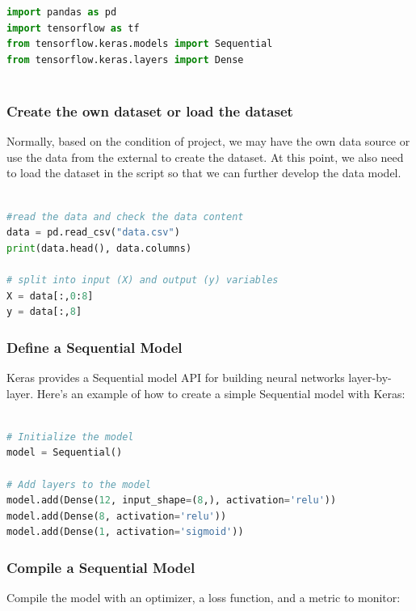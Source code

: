 	\begin{lstlisting}[language=python]
import pandas as pd
import tensorflow as tf
from tensorflow.keras.models import Sequential
from tensorflow.keras.layers import Dense
	
	\end{lstlisting}

	\subsubsection{Create the own dataset or load the dataset}
Normally, based on the condition of project, we may have the own data source or use the data from the external to create the dataset. At this point, we also need to load the dataset in the script so that we can further develop the data model. \cite{brownlee:2022}

\begin{lstlisting}[language=python]
	
#read the data and check the data content 
data = pd.read_csv("data.csv")
print(data.head(), data.columns)

# split into input (X) and output (y) variables
X = data[:,0:8]
y = data[:,8]

\end{lstlisting}

\subsubsection{Define a Sequential Model}

Keras provides a Sequential model API for building neural networks layer-by-layer. Here's an example of how to create a simple Sequential model with Keras:

	\begin{lstlisting}[language=python]

# Initialize the model
model = Sequential()

# Add layers to the model
model.add(Dense(12, input_shape=(8,), activation='relu'))
model.add(Dense(8, activation='relu'))
model.add(Dense(1, activation='sigmoid'))

\end{lstlisting}

\subsubsection{Compile a Sequential Model}

Compile the model with an optimizer, a loss function, and a metric to monitor:

